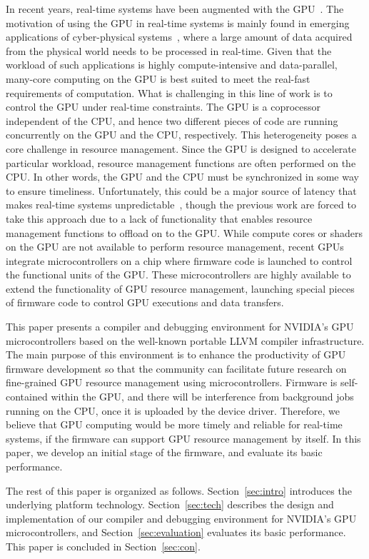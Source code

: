\par
In recent years, real-time systems have been augmented with
the GPU~\cite{Kato_ATC11, Kato_RTSS11, Kato_RTAS11, Basaran_ECRTS12,
Elliott_ECRTS12, Elliott_RTS12}.
The motivation of using the GPU in real-time systems is mainly found in
emerging applications of cyber-physical systems~\cite{Aumiller_CPSNA12,
McNaughton_ICRA11, Ferreira_JRTIP11}, where a large
amount of data acquired from the physical world needs to be processed in
real-time.
Given that the workload of such applications is highly compute-intensive and
data-parallel, many-core computing on the GPU is best suited to meet the
real-fast requirements of computation.
What is challenging in this line of work is to control the GPU under
real-time constraints.
The GPU is a coprocessor independent of the CPU, and hence two different
pieces of code are running concurrently on the GPU and the CPU, respectively.
This heterogeneity poses a core challenge in resource management.
Since the GPU is designed to accelerate particular workload, resource
management functions are often performed on the CPU.
In other words, the GPU and the CPU must be synchronized in some way to
ensure timeliness.
Unfortunately, this could be a major source of latency that makes
real-time systems unpredictable~\cite{Kato_ATC11}, though the previous
work are forced to take this approach due to a lack of functionality
that enables resource management functions to offload on to the GPU.
While compute cores or shaders on the GPU are not available to perform
resource management, recent GPUs integrate microcontrollers on a chip
where firmware code is launched to control the functional units of the
GPU.
These microcontrollers are highly available to extend the functionality
of GPU resource management, launching special pieces of firmware code to
control GPU executions and data transfers.

\par
This paper presents a compiler and debugging environment for NVIDIA's
GPU microcontrollers based on the well-known portable LLVM compiler
infrastructure.
The main purpose of this environment is to enhance the productivity of
GPU firmware development so that the community can facilitate future
research on fine-grained GPU resource management using microcontrollers.
Firmware is self-contained within the GPU, and there will be
interference from background jobs running on the CPU, once it is
uploaded by the device driver.
Therefore, we believe that GPU computing would be more timely and
reliable for real-time systems, if the firmware can support GPU resource
management by itself.
In this paper, we develop an initial stage of the firmware, and evaluate
its basic performance.

\par
The rest of this paper is organized as follows.
Section~\ref{sec:intro} introduces the underlying platform technology.
Section~\ref{sec:tech} describes the design and implementation of our
compiler and debugging environment for NVIDIA's GPU microcontrollers,
and Section~\ref{sec:evaluation} evaluates its basic performance.
This paper is concluded in Section~\ref{sec:con}.
